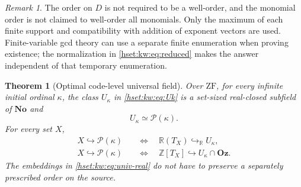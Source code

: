 \documentclass[11pt,letterpaper]{article}
\newtheorem{theorem}{Theorem}[section]
\theoremstyle{definition}
\theoremstyle{remark}
\newtheorem{remark}[remark]{Remark}\aliascntresetthe{remark}
\newcommand{\No}{\mathbf{No}}
\newcommand{\Pow}{\mathcal P}
\newcommand{\ZF}{\mathrm{ZF}}
\newcommand{\Oz}{\mathbf{Oz}}
\newcommand{\R}{\mathbb R}
\newcommand{\Z}{\mathbb Z}
\begin{document}
\begin{remark}
The order on $D$ is not required to be a well-order, and the monomial order is not claimed to well-order all monomials. Only the maximum of each finite support and compatibility with addition of exponent vectors are used. Finite-variable gcd theory can use a separate finite enumeration when proving existence; the normalization in \eqref{hset:kw:eq:reduced} makes the answer independent of that temporary enumeration.
\end{remark}

\begin{theorem}[Optimal code-level universal field]\label{hset:kw:thm:universal}
Over $\ZF$, for every infinite initial ordinal $\kappa$, the class $U_\kappa$ in \eqref{hset:kw:eq:Uk} is a set-sized real-closed subfield of $\No$ and
\begin{equation}\label{hset:kw:eq:Uk-card}
U_\kappa\simeq\Pow(\kappa).
\end{equation}
For every set $X$,
\begin{align}
X\hookrightarrow\Pow(\kappa)
&\quad\Longleftrightarrow\quad
\R(T_X)\hookrightarrow_{\R}U_\kappa,\label{hset:kw:eq:univ-real}\\
X\hookrightarrow\Pow(\kappa)
&\quad\Longleftrightarrow\quad
\Z[T_X]\hookrightarrow U_\kappa\cap\Oz.
\label{hset:kw:eq:univ-omnific}
\end{align}
The embeddings in \eqref{hset:kw:eq:univ-real} do not have to preserve a separately prescribed order on the source.
\end{theorem}
\end{document}
